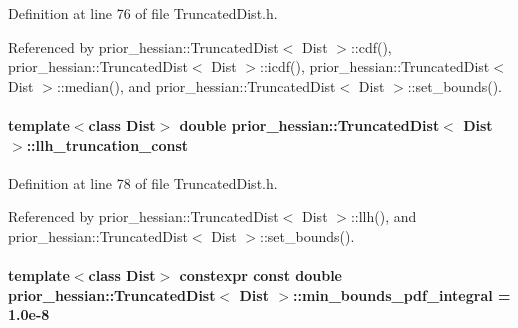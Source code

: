 Definition at line 76 of file Truncated\+Dist.\+h.



Referenced by prior\+\_\+hessian\+::\+Truncated\+Dist$<$ Dist $>$\+::cdf(), prior\+\_\+hessian\+::\+Truncated\+Dist$<$ Dist $>$\+::icdf(), prior\+\_\+hessian\+::\+Truncated\+Dist$<$ Dist $>$\+::median(), and prior\+\_\+hessian\+::\+Truncated\+Dist$<$ Dist $>$\+::set\+\_\+bounds().

\paragraph[{\texorpdfstring{llh\+\_\+truncation\+\_\+const}{llh_truncation_const}}]{\setlength{\rightskip}{0pt plus 5cm}template$<$class Dist$>$ double {\bf prior\+\_\+hessian\+::\+Truncated\+Dist}$<$ Dist $>$\+::llh\+\_\+truncation\+\_\+const\hspace{0.3cm}{\ttfamily [protected]}}\hypertarget{classprior__hessian_1_1TruncatedDist_ad2c7a842ec19d01a2f8c1daa50336ddd}{}\label{classprior__hessian_1_1TruncatedDist_ad2c7a842ec19d01a2f8c1daa50336ddd}


Definition at line 78 of file Truncated\+Dist.\+h.



Referenced by prior\+\_\+hessian\+::\+Truncated\+Dist$<$ Dist $>$\+::llh(), and prior\+\_\+hessian\+::\+Truncated\+Dist$<$ Dist $>$\+::set\+\_\+bounds().

\paragraph[{\texorpdfstring{min\+\_\+bounds\+\_\+pdf\+\_\+integral}{min_bounds_pdf_integral}}]{\setlength{\rightskip}{0pt plus 5cm}template$<$class Dist$>$ constexpr const double {\bf prior\+\_\+hessian\+::\+Truncated\+Dist}$<$ Dist $>$\+::min\+\_\+bounds\+\_\+pdf\+\_\+integral = 1.\+0e-\/8\hspace{0.3cm}{\ttfamily [static]}}\hypertarget{classprior__hessian_1_1TruncatedDist_ac349a0a87f48b62b4d72fa4ca6942fd7}{}\label{classprior__hessian_1_1TruncatedDist_ac349a0a87f48b62b4d72fa4ca6942fd7}


